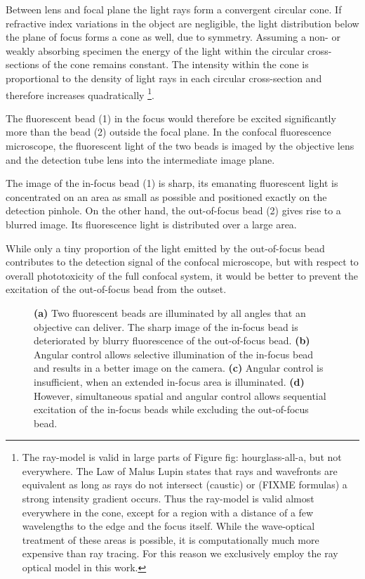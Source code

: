 Between lens and focal plane the light rays form a convergent circular
cone. If refractive index variations in the object are negligible, the
light distribution below the plane of focus forms a cone as well, due
to symmetry.  Assuming a non- or weakly absorbing specimen the energy
of the light within the circular cross-sections of the cone remains
constant. The intensity within the cone is proportional to the density
of light rays in each circular cross-section and therefore increases
quadratically \footnote{ The ray-model is valid in large parts of
  Figure fig: hourglass-all-a, but not everywhere. The Law of Malus
  Lupin states that rays and wavefronts are equivalent as long as rays
  do not intersect (caustic) or (FIXME formulas) a strong intensity
  gradient occurs. Thus the ray-model is valid almost everywhere in
  the cone, except for a region with a distance of a few wavelengths
  to the edge and the focus itself. While the wave-optical treatment
  of these areas is possible, it is computationally much more
  expensive than ray tracing. For this reason we exclusively employ
  the ray optical model in this work.}.


The fluorescent bead (1) in the focus would therefore be excited
significantly more than the bead (2) outside the focal plane. In the
confocal fluorescence microscope, the fluorescent light of the two
beads is imaged by the objective lens and the detection tube lens into
the intermediate image plane.

The image of the in-focus bead (1) is sharp, its emanating fluorescent
light is concentrated on an area as small as possible and positioned
exactly on the detection pinhole.  On the other hand, the out-of-focus
bead (2) gives rise to a blurred image. Its fluorescence light is
distributed over a large area.

While only a tiny proportion of the light emitted by the out-of-focus
bead contributes to the detection signal of the confocal microscope,
but with respect to overall phototoxicity of the full confocal system,
it would be better to prevent the excitation of the out-of-focus bead
from the outset.

\begin{figure}[!hbt]
  \centering
  \caption{{\bf (a)} Two fluorescent beads are illuminated by all
    angles that an objective can deliver. The sharp image of the
    in-focus bead is deteriorated by blurry fluorescence of the
    out-of-focus bead. {\bf (b)} Angular control allows selective
    illumination of the in-focus bead and results in a better image on
    the camera. {\bf (c)} Angular control is insufficient, when an
    extended in-focus area is illuminated. {\bf (d)} However,
    simultaneous spatial and angular control allows sequential
    excitation of the in-focus beads while excluding the out-of-focus
    bead.}
  \label{fig:hourglass-all}
\end{figure}



